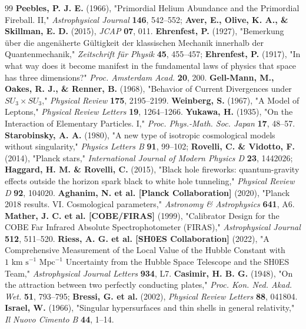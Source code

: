 \documentclass[10pt,a4paper]{article}
\begin{document}
\begin{thebibliography}{99}
 \textbf{Peebles, P. J. E.} (1966), "Primordial Helium Abundance and the Primordial Fireball. II," \textit{Astrophysical Journal} \textbf{146}, 542–552; \textbf{Aver, E., Olive, K. A., \& Skillman, E. D.} (2015), \textit{JCAP} \textbf{07}, 011.
 \textbf{Ehrenfest, P.} (1927), "Bemerkung über die angenäherte Gültigkeit der klassischen Mechanik innerhalb der Quantenmechanik," \textit{Zeitschrift für Physik} \textbf{45}, 455–457; \textbf{Ehrenfest, P.} (1917), "In what way does it become manifest in the fundamental laws of physics that space has three dimensions?" \textit{Proc. Amsterdam Acad.} \textbf{20}, 200.
 \textbf{Gell-Mann, M., Oakes, R. J., \& Renner, B.} (1968), "Behavior of Current Divergences under $SU_3 \times SU_3$," \textit{Physical Review} \textbf{175}, 2195–2199.
 \textbf{Weinberg, S.} (1967), "A Model of Leptons," \textit{Physical Review Letters} \textbf{19}, 1264–1266.
 \textbf{Yukawa, H.} (1935), "On the Interaction of Elementary Particles. I," \textit{Proc. Phys.-Math. Soc. Japan} \textbf{17}, 48–57.
 \textbf{Starobinsky, A. A.} (1980), "A new type of isotropic cosmological models without singularity," \textit{Physics Letters B} \textbf{91}, 99–102; \textbf{Rovelli, C. \& Vidotto, F.} (2014), "Planck stars," \textit{International Journal of Modern Physics D} \textbf{23}, 1442026; \textbf{Haggard, H. M. \& Rovelli, C.} (2015), "Black hole fireworks: quantum-gravity effects outside the horizon spark black to white hole tunneling," \textit{Physical Review D} \textbf{92}, 104020.
 \textbf{Aghanim, N. et al. [Planck Collaboration]} (2020), "Planck 2018 results. VI. Cosmological parameters," \textit{Astronomy \& Astrophysics} \textbf{641}, A6.
 \textbf{Mather, J. C. et al. [COBE/FIRAS]} (1999), "Calibrator Design for the COBE Far Infrared Absolute Spectrophotometer (FIRAS)," \textit{Astrophysical Journal} \textbf{512}, 511–520.
 \textbf{Riess, A. G. et al. [SH0ES Collaboration]} (2022), "A Comprehensive Measurement of the Local Value of the Hubble Constant with $1\text{ km s}^{-1}\text{ Mpc}^{-1}$ Uncertainty from the Hubble Space Telescope and the SH0ES Team," \textit{Astrophysical Journal Letters} \textbf{934}, L7.
 \textbf{Casimir, H. B. G.} (1948), "On the attraction between two perfectly conducting plates," \textit{Proc. Kon. Ned. Akad. Wet.} \textbf{51}, 793–795; \textbf{Bressi, G. et al.} (2002), \textit{Physical Review Letters} \textbf{88}, 041804.
 \textbf{Israel, W.} (1966), "Singular hypersurfaces and thin shells in general relativity," \textit{Il Nuovo Cimento B} \textbf{44}, 1–14.

\end{thebibliography}
\end{document}
